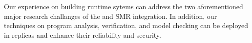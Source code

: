 Our experience on building \smt runtime sytems can address the two 
aforementioned major research challanges of the \smt and SMR integration. In 
addition, our techniques on program analysis, verification, and model checking 
can be deployed in \xxx replicas and enhance their reliability and security.


